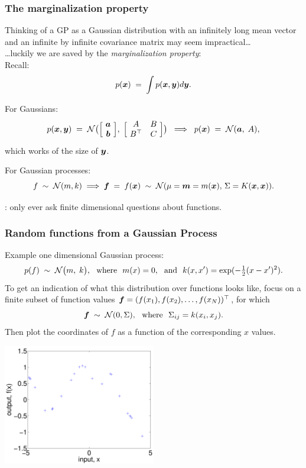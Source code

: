 \begin{frame}
\frametitle{The marginalization property}

Thinking of a GP as a Gaussian distribution with an infinitely long mean vector
and an infinite by infinite covariance matrix may seem impractical\ldots\\[1ex]

\ldots luckily we are saved by the \emph{marginalization property}:\\[1ex]

Recall:
\[
p(\bm x)\;=\;\int p(\bm x,\bm y)d\bm y.
\]

For Gaussians:
\[
p(\bm x,\bm y)\;=\;{\cal N}\big(\Big[\!\begin{array}{c}\bm a \\ \bm b
\end{array}\!\Big],
\;\Big[\!\begin{array}{cc}A & B \\ B^\top & C\end{array}\!\Big]\big)
\;\;\Longrightarrow\;\;p(\bm x)\;=\;{\cal N}(\bm a,\;A),
\]
which works  of the size of $\bm y$.

For Gaussian processes:
\[
  f\;\sim\;{\cal N}(m,k)\;\Longrightarrow\;\bm f\;=\;f(\bm x)\;\sim\;{\cal
    N}(\mu=\bm m=m(\bm x),\,\Sigma=K(\bm x,\bm x)).
\]

: only ever ask finite dimensional questions about functions.

\end{frame}


\begin{frame}
\frametitle{Random functions from a Gaussian Process}

Example one dimensional Gaussian process:
\[
p(f)\;\sim\;{\cal N}\big(m,\;k\big),
\text{\ \ where\ \ }m(x) = 0,\text{\ \ and\ \ }k(x,x') = \exp(-\tfrac{1}{2}(x-x')^2).
\]
%
To get an indication of what this distribution over functions looks like, focus
on a finite subset of function values
$\bm f=(f(x_1),f(x_2),\ldots,f(x_N))^\top$, for which
\[
\bm f\;\sim\;{\cal N}(0, \Sigma),\text{\ \ where\ \ }\Sigma_{ij}=k(x_i,x_j).
\]
%
Then plot the coordinates of $f$ as a function of the corresponding $x$ values.
\centerline{\includegraphics[width=0.5\textwidth]{prior1}}
\end{frame}


